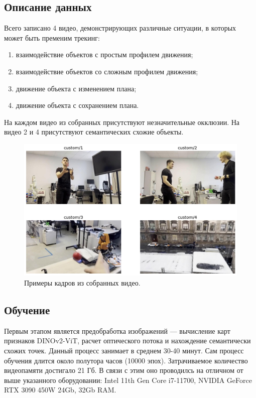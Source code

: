 \documentclass[a4paper, 14pt]{extarticle}
\theoremstyle{definition}
\theoremstyle{plain}
\theoremstyle{remark}
\begin{document}
\subsection{Описание данных}
Всего записано 4 видео, демонстрирующих различные ситуации, в которых может быть пременим трекинг:
\begin{enumerate}
	\item взаимодействие объектов с простым профилем движения;
	\item взаимодействие объектов со сложным профилем движения;
	\item движение объекта с изменением плана;
	\item движение объекта с сохранением плана.
\end{enumerate}

На каждом видео из собранных присутствуют незначительные окклюзии. На видео 2 и 4 присутствуют семантических схожие объекты. 
\begin{figure}
    [H]
    \centering
    \includegraphics[width=\textwidth]{figs/custom_expl.png}
    \caption{Примеры кадров из собранных видео.}
    \label{fig:custom-expl}
\end{figure}

\subsection{Обучение}

Первым этапом является предобработка изображений --- вычисление карт признаков DINOv2-ViT, расчет оптического потока и нахождение семантически схожих точек. Данный процесс занимает в среднем 30-40 минут. Сам процесс обучения длится около полутора часов (10000 эпох).
Затрачиваемое количество видеопамяти достигало 21 Гб. В связи с этим оно проводилсь на отличном от выше указанного оборудовании: Intel 11th Gen Core i7-11700, NVIDIA GeForce RTX 3090 450W 24Gb, 32Gb RAM.
\end{document}
